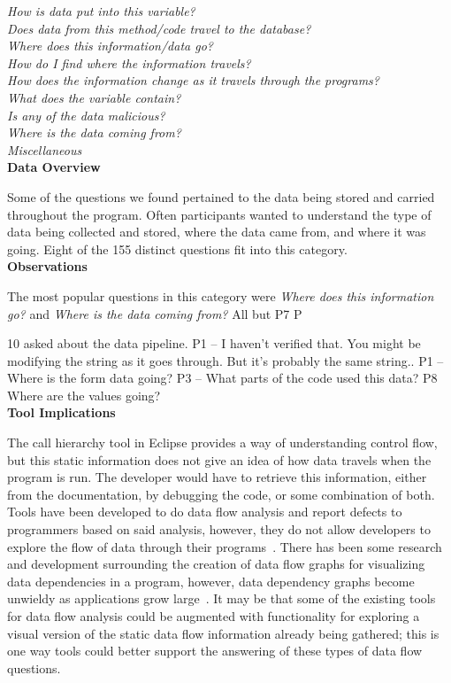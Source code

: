 \documentclass[conference]{IEEEtran}
\begin{document}
\noindent\emph{How is data put into this variable?} \\
\emph{Does data from this method/code travel to the database?} \\
\emph{Where does this information/data go?} \\
\emph{How do I find where the information travels?} \\
\emph{How does the information change as it travels through the programs?} \\
\emph{What does the variable contain?} \\
\emph{Is any of the data malicious?} \\
\emph{Where is the data coming from?} \\
\emph{Miscellaneous} \\

\noindent\textbf{Data Overview}

Some of the questions we found pertained to the data being stored and carried throughout the program. 
Often participants wanted to understand  the type of data being collected and stored, where the data came from, and where it was going. 
Eight of the 155 distinct questions fit into this category.
\\

\noindent\textbf{Observations}

The most popular questions in this category were \textit{Where does this information go?} and  \textit{Where is the data coming from?}
All but P7 P

10 asked about the data pipeline. 
P1 -- I haven't verified that. You might be modifying the string as it goes through. But it's probably the same string.. 
P1 -- Where is the form data going?
P3 -- What parts of the code used this data?
P8 Where are the values going?
\\

\noindent\textbf{Tool Implications}

The call hierarchy tool in Eclipse provides a way of understanding control flow, but this static information does not give an idea of how data travels when the program is run. 
The developer would have to retrieve this information, either from the documentation, by debugging the code, or some combination of both. 
Tools have been developed to do data flow analysis and report defects to programmers based on said analysis, however, they do not allow developers to explore the flow of data through their programs~\cite{jovanovic2006pixy}. 
There has been some research and development surrounding the creation of data flow graphs for visualizing data dependencies in a program, however, data dependency graphs become unwieldy as applications grow large~\cite{ghosh2001method, ferrante1987program}. 
It may be that some of the existing tools for data flow analysis could be augmented with functionality for exploring a visual version of the static data flow information already being gathered; this is one way tools could better support the answering of these types of data flow questions.
\\
\end{document}
